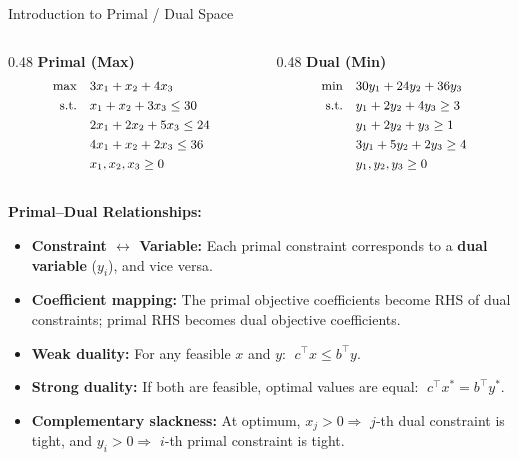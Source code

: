 \documentclass{beamer}
\begin{document}
\begin{frame}{Introduction to Primal / Dual Space}
  \footnotesize
  \begin{columns}[T]
    \begin{column}{0.48\textwidth}
      \textbf{Primal (Max)}
      \[
        \small
        \begin{aligned}
          \max \quad & 3x_1 + x_2 + 4x_3 \\
          \text{s.t.} \quad & x_1 + x_2 + 3x_3 \le 30 \\
                            & 2x_1 + 2x_2 + 5x_3 \le 24 \\
                            & 4x_1 + x_2 + 2x_3 \le 36 \\
                            & x_1, x_2, x_3 \ge 0
        \end{aligned}
      \]
    \end{column}
    \begin{column}{0.48\textwidth}
      \textbf{Dual (Min)}
      \[
        \small
        \begin{aligned}
          \min \quad & 30y_1 + 24y_2 + 36y_3 \\
          \text{s.t.} \quad & y_1 + 2y_2 + 4y_3 \ge 3 \\
                            & y_1 + 2y_2 + y_3 \ge 1 \\
                            & 3y_1 + 5y_2 + 2y_3 \ge 4 \\
                            & y_1, y_2, y_3 \ge 0
        \end{aligned}
      \]
    \end{column}
  \end{columns}

  \textbf{Primal–Dual Relationships:}
  \begin{itemize}
	  \item \textbf{Constraint $\leftrightarrow$ Variable:} Each primal constraint corresponds to a {\bf dual variable} ($y_i$), and vice versa.
    \item \textbf{Coefficient mapping:} The primal objective coefficients become RHS of dual constraints; primal RHS becomes dual objective coefficients.
    \item \textbf{Weak duality:} For any feasible $x$ and $y$: $\;c^\top x \le b^\top y$.
    \item \textbf{Strong duality:} If both are feasible, optimal values are equal: $\;c^\top x^* = b^\top y^*$.
    \item \textbf{Complementary slackness:} At optimum, $x_j > 0 \Rightarrow$ $j$-th dual constraint is tight, and $y_i > 0 \Rightarrow$ $i$-th primal constraint is tight.
  \end{itemize}
\end{frame}
\end{document}

